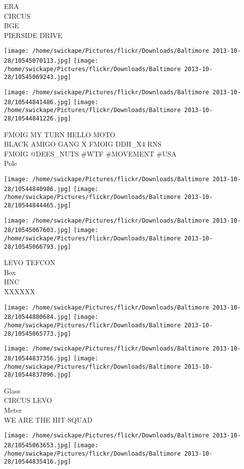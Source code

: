 \documentclass[10pt,letterpaper]{article}
\begin{document}
ERA\\
CIRCUS\\
BGE\\
PIERSIDE DRIVE
\pagebreak

\texttt{[image: /home/swickape/Pictures/flickr/Downloads/Baltimore 2013-10-28/10545070113.jpg]}
\texttt{[image: /home/swickape/Pictures/flickr/Downloads/Baltimore 2013-10-28/10545069243.jpg]}

\texttt{[image: /home/swickape/Pictures/flickr/Downloads/Baltimore 2013-10-28/10544841486.jpg]}
\texttt{[image: /home/swickape/Pictures/flickr/Downloads/Baltimore 2013-10-28/10544841226.jpg]}

FMOIG MY TURN HELLO MOTO\\
BLACK AMIGO GANG X FMOIG DDH\_X4 RNS\\
FMOIG @DEES\_NUTS \#WTF \#MOVEMENT \#USA\\
Pole
\pagebreak

\texttt{[image: /home/swickape/Pictures/flickr/Downloads/Baltimore 2013-10-28/10544840986.jpg]}
\texttt{[image: /home/swickape/Pictures/flickr/Downloads/Baltimore 2013-10-28/10544844465.jpg]}

\texttt{[image: /home/swickape/Pictures/flickr/Downloads/Baltimore 2013-10-28/10545067603.jpg]}
\texttt{[image: /home/swickape/Pictures/flickr/Downloads/Baltimore 2013-10-28/10545066793.jpg]}

LEVO TEFCON\\
Box\\
HNC\\
XXXXXX
\pagebreak

\texttt{[image: /home/swickape/Pictures/flickr/Downloads/Baltimore 2013-10-28/10544880684.jpg]}
\texttt{[image: /home/swickape/Pictures/flickr/Downloads/Baltimore 2013-10-28/10545065773.jpg]}

\texttt{[image: /home/swickape/Pictures/flickr/Downloads/Baltimore 2013-10-28/10544837356.jpg]}
\texttt{[image: /home/swickape/Pictures/flickr/Downloads/Baltimore 2013-10-28/10544837096.jpg]}

Glass\\
CIRCUS LEVO\\
Meter\\
WE ARE THE HIT SQUAD
\pagebreak

\texttt{[image: /home/swickape/Pictures/flickr/Downloads/Baltimore 2013-10-28/10545063653.jpg]}
\texttt{[image: /home/swickape/Pictures/flickr/Downloads/Baltimore 2013-10-28/10544835416.jpg]}
\end{document}
